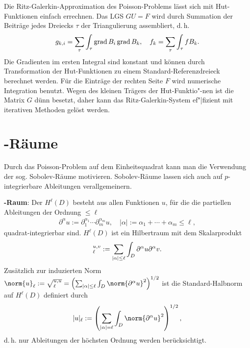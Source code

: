 \linie

Die Ritz-Galerkin-Approximation des Poisson-Problems lässt sich mit Hut-Funktionen einfach
errechnen.
Das LGS $GU = F$ wird durch Summation der Beiträge jedes Dreiecks $\tau$ der Triangulierung
assembliert, d.\,h.
\begin{align*}
    g_{k,i} = \sum_\tau \int_\tau \operatorname{grad} B_i \operatorname{grad} B_k,\quad
    f_k = \sum_\tau \int_\tau f B_k.
\end{align*}
Die Gradienten im ersten Integral sind konstant und können durch Transformation der Hut-Funktionen
zu einem Standard-Referenzdreieck berechnet werden.
Für die Einträge der rechten Seite $F$ wird numerische Integration benutzt.
Wegen des kleinen Trägers der Hut-Funktio"-nen ist die Matrix $G$ dünn besetzt,
daher kann das Ritz-Galerkin-System ef"|fizient mit iterativen Methoden gelöst werden.

\pagebreak

\section{%
    -Räume%
}

Durch das Poisson-Problem auf dem Einheitsquadrat kann man die Verwendung der sog.
Sobolev-Räume motivieren.
Sobolev-Räume lassen sich auch auf $p$-integrierbare Ableitungen verallgemeinern.

\textbf{-Raum}:
Der  $H^\ell(D)$ besteht aus allen Funktionen $u$, für die die
partiellen Ableitungen der Ordnung $\le \ell$
\begin{align*}
    \partial^\alpha u := \partial_1^{\alpha_1} \dotsm \partial_m^{\alpha_m} u,\quad
    |\alpha| := \alpha_1 + \dotsb + \alpha_m \le \ell,
\end{align*}
quadrat-integrierbar sind.
$H^\ell(D)$ ist ein Hilbertraum mit dem Skalarprodukt
\begin{align*}
    \sp{u, v}_\ell := \sum_{|\alpha| \le \ell} \int_D \partial^\alpha u \partial^\alpha v.
\end{align*}
Zusätzlich zur induzierten Norm
$\norm{u}_\ell := \sqrt{\sp{u, u}_\ell} =
\left(\sum_{|\alpha| \le \ell} \int_D \norm{\partial^\alpha u}^2\right)^{1/2}$ ist die
Standard-Halbnorm auf $H^\ell(D)$ definiert durch
\begin{align*}
    |u|_\ell := \left(\sum_{|\alpha| = \ell} \int_D \norm{\partial^\alpha u}^2\right)^{1/2},
\end{align*}
d.\,h. nur Ableitungen der höchsten Ordnung werden berücksichtigt.

